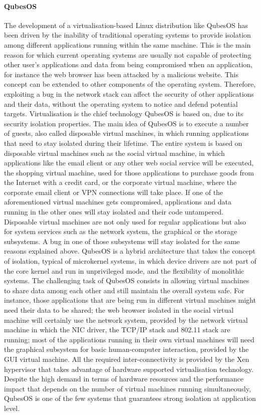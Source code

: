 \paragraph{QubesOS}
The development of a virtualisation-based Linux distribution like QubesOS \cite{qubesos} has been driven by the inability of traditional operating systems to provide isolation among different applications running within the same machine.  This is the main reason for which current operating systems are usually not capable of protecting other user's applications and data from being compromised when an application, for instance the web browser has been attacked by a malicious website. This concept can be extended to other components of the operating system. Therefore, exploiting a bug in the network stack can affect the security of other applications and their data, without the operating system to notice and defend potential targets.
Virtualisation is the chief technology QubesOS is based on, due to its security isolation properties. The main idea of QubesOS is to execute a number of guests, also called disposable virtual machines, in which running applications that need to stay isolated during their lifetime. The entire system is based on disposable virtual machines such as the social virtual machine, in which applications like the email client or any other web social service will be executed, the shopping virtual machine, used for those applications to purchase goods from the Internet with a credit card, or the corporate virtual machine, where the corporate email client or VPN connections will take place. 
If one of the aforementioned virtual machines gets compromised, applications and data running in the other ones will stay isolated and their code untampered.
Disposable virtual machines are not only used for regular applications but also for system services such as the network system, the graphical or the storage subsystems. A bug in one of those subsystems will stay isolated for the same reasons explained above.
QubesOS is a hybrid architecture that takes the concept of isolation, typical of microkernel systems, in which device drivers are not part of the core kernel and run in unprivileged mode, and the flexibility of monolithic systems.
The challenging task of QubesOS consists in allowing virtual machines to share data among each other and still maintain the overall system safe. For instance, those applications that are being run in different virtual machines might need their data to be shared; the web browser isolated in the social virtual machine will certainly use the network system, provided by the network virtual machine in which the NIC driver, the TCP/IP stack and 802.11 stack are running; most of the applications running in their own virtual machines will need the graphical subsystem for basic human-computer interaction, provided by the GUI virtual machine. 
All the required inter-connectivity is provided by the Xen hypervisor that takes advantage of hardware supported virtualisation technology. Despite the high demand in terms of hardware resources and the performance impact that depends on the number of virtual machines running simultaneously, QubesOS is one of the few systems that guarantees strong isolation at application level.

